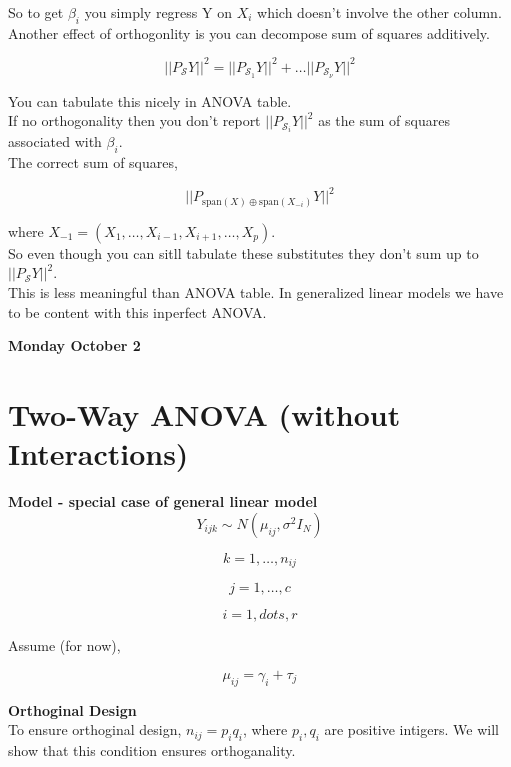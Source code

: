 \documentclass[11pt,fleqn]{book} %
\begin{document}
So to get $\beta_i$ you simply regress Y on $X_i$ which doesn't involve the other column.\\

Another effect of orthogonlity is you can decompose sum of squares additively. 

		$$||P_\mathcal{S} Y ||^2  = ||P_{\mathcal{S}_1} Y ||^2  + \dots ||P_{\mathcal{S}_\nu} Y ||^2 $$

You can tabulate this nicely in ANOVA table. \\

If no orthogonality then you don't report $||P_{\mathcal{S}_i} Y ||^2 $ as the sum of squares associated with $\beta_i$. \\

The correct sum of squares, 

		$$||P_{\text{span}(X) \oplus \text{span}(X_{-i})} Y ||^2$$

where $X_{-1} = (X_1, \dots, X_{i - 1}, X_{i+1}, \dots, X_p)$. \\

So even though you can sitll tabulate these substitutes they don't sum up to $||P_\mathcal{S} Y ||^2 $. \\

This is less meaningful than ANOVA table. In generalized linear models we have to be content with this inperfect ANOVA. 



\textbf{Monday October 2}\\

\section{Two-Way ANOVA (without Interactions)}

\textbf{Model - special case of general linear model}\\

		$$Y_{ijk} \sim N(\mu_{ij}, \sigma^2 I_N) $$

		$$k= 1, \dots, n_{ij} $$

		$$j = 1, \dots, c $$

		$$i = 1, dots, r $$

Assume (for now), 

		$$\mu_{ij} = \gamma_i + \tau_j $$

\textbf{Orthoginal Design}\\

To ensure orthoginal design, $n_{ij} = p_iq_i$, where $p_i, q_i$ are positive intigers. We will show that this condition ensures orthoganality. \\
\end{document}
